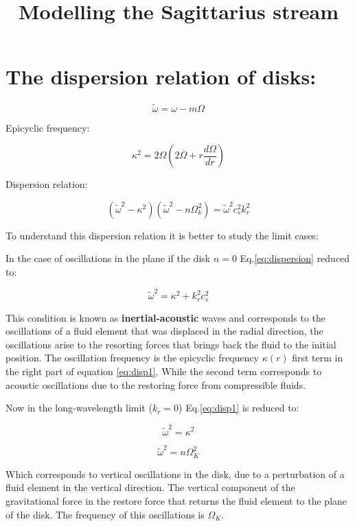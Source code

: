 \documentclass[12pt]{article}
\title{\begin{LARGE}
{Modelling the Sagittarius stream}
\end{LARGE}}
\begin{document}
\section*{The dispersion relation of disks:}

\begin{equation}
\tilde{\omega} = \omega - m\Omega
\end{equation}

Epicyclic frequency:

\begin{equation}
\kappa^2 = 2\Omega \left( 2\Omega + r \dfrac{d\Omega}{dr}  \right)
\end{equation}

Dispersion relation:

\begin{equation}\label{eq:dispersion}
(\tilde{\omega}^2 - \kappa^2)(\tilde{\omega}^2 - n\Omega_k^2) =
\tilde{\omega}^2 c_s^2 k_r^2
\end{equation}

To understand this dispersion relation it is better to study the limit
cases:

In the case of oscillations in the plane if the disk
$n=0$ Eq.\ref{eq:dispersion} reduced to:

\begin{equation}\label{eq:disp1}
\tilde{\omega}^2 = \kappa^2 + k_r^2 c_s^2
\end{equation}

This condition is known as \textbf{inertial-acoustic} waves
and corresponds to the oscillations of a fluid element that was
displaced in the radial direction, the oscillations arise to the
resorting forces that brings back the fluid to the initial position.
The oscillation frequency is the epicyclic frequency $\kappa(r)$ first
term in the right part of equation \ref{eq:disp1}. While the second
term corresponds to acoustic oscillations due to the restoring force
from compressible fluids.

Now in the long-wavelength limit ($k_r=0$) Eq.\ref{eq:disp1} is
reduced to:

\begin{equation}
\tilde{\omega}^2 = \kappa^2
\end{equation}

\begin{equation}
\tilde{\omega}^2 = n \Omega_K^2
\end{equation}

Which corresponds to vertical oscillations in the disk, due to a
perturbation of a fluid element in the vertical direction. The
vertical component of the gravitational force in the restore force
that returns the fluid element to the plane of the disk. The frequency
of this oscillations is $\Omega_K$.
\end{document}
